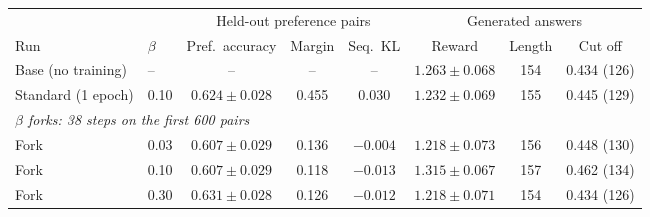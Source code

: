 \begin{adjustbox}{max width=\linewidth}
\begin{tabular}{llcccccc}
\toprule
 & & \multicolumn{3}{c}{Held-out preference pairs} & \multicolumn{3}{c}{Generated answers} \\
\cmidrule(lr){3-5} \cmidrule(lr){6-8}
Run & $\beta$ & Pref.\ accuracy & Margin & Seq.\ KL & Reward & Length & Cut off \\
\midrule
Base (no training) & -- & -- & -- & -- & $1.263 \pm 0.068$ & 154 & 0.434 (126) \\
Standard (1 epoch) & 0.10 & $0.624 \pm 0.028$ & 0.455 & 0.030 & $1.232 \pm 0.069$ & 155 & 0.445 (129) \\
\midrule
\multicolumn{8}{l}{\emph{$\beta$ forks: 38 steps on the first 600 pairs}} \\
Fork & 0.03 & $0.607 \pm 0.029$ & 0.136 & $-0.004$ & $1.218 \pm 0.073$ & 156 & 0.448 (130) \\
Fork & 0.10 & $0.607 \pm 0.029$ & 0.118 & $-0.013$ & $1.315 \pm 0.067$ & 157 & 0.462 (134) \\
Fork & 0.30 & $0.631 \pm 0.028$ & 0.126 & $-0.012$ & $1.218 \pm 0.071$ & 154 & 0.434 (126) \\
\bottomrule
\end{tabular}
\end{adjustbox}
